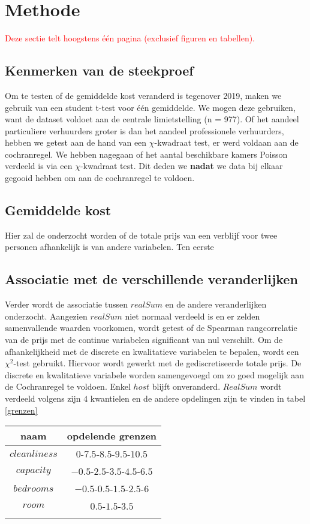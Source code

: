 \documentclass[a4paper]{kulakarticle}
\newcommand{\rood}[1]{\textcolor{red}{#1}}
\begin{document}
	\section{Methode}
	\rood{Deze sectie telt hoogstens één pagina (exclusief figuren en tabellen).}
	\subsection{Kenmerken van de steekproef}
Om te testen of de gemiddelde kost veranderd is tegenover 2019, maken we gebruik van een student t-test voor één gemiddelde. We mogen deze gebruiken, want de dataset voldoet aan de centrale limietstelling (n = 977). Of het aandeel particuliere verhuurders groter is dan het aandeel professionele verhuurders, hebben we getest aan de hand van een $\chi$-kwadraat test, er werd voldaan aan de cochranregel. We hebben nagegaan of het aantal beschikbare kamers Poisson verdeeld is via een $\chi$-kwadraat test. Dit deden we \textbf{nadat} we data bij elkaar gegooid hebben om aan de cochranregel te voldoen.
	
	\subsection{Gemiddelde kost}
	
	Hier zal de onderzocht worden of de totale prijs van een verblijf voor twee personen afhankelijk is van andere variabelen. Ten eerste 
	

	\subsection{Associatie met de verschillende veranderlijken}
	
	
	Verder wordt de associatie tussen $realSum$ en de andere veranderlijken onderzocht. Aangezien $realSum$ niet normaal verdeeld is en er zelden samenvallende waarden voorkomen, wordt getest of de Spearman rangcorrelatie van de prijs met de continue variabelen significant van nul verschilt. Om de afhankelijkheid met de discrete en kwalitatieve variabelen te bepalen, wordt een $\chi ^2$-test gebruikt. Hiervoor wordt gewerkt met de gediscretiseerde totale prijs. De discrete en kwalitatieve variabele worden samengevoegd om zo goed mogelijk aan de Cochranregel te voldoen. Enkel $host$ blijft onveranderd. $RealSum$ wordt verdeeld volgens zijn $4$ kwantielen en de andere opdelingen zijn te vinden in tabel \ref{grenzen}
	
	\begin{tabular}{c|c}
		naam& opdelende grenzen\\
		\hline
		$cleanliness$ & $ 0$-$7.5$-$8.5$-$9.5$-$10.5$ \\
		$capacity$& $-0.5$-$2.5$-$3.5$-$4.5$-$6.5$\\
		$bedrooms$& $-0.5$-$0.5$-$1.5$-$2.5$-$6$\\
		$room$& $0.5$-$1.5$-$3.5$\\
		\label{grenzen}
	\end{tabular}
	
\end{document}

